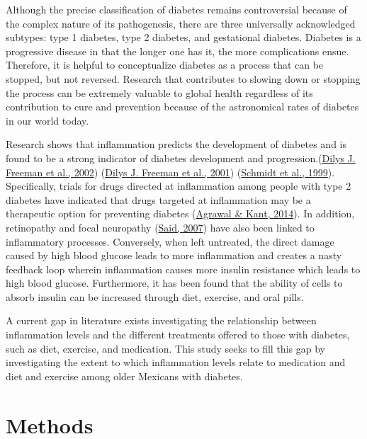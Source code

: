 \documentclass[
  man]{apa6}
\begin{document}
Although the precise classification of diabetes remains controversial because of the complex nature of its pathogenesis, there are three universally acknowledged subtypes: type 1 diabetes, type 2 diabetes, and gestational diabetes. Diabetes is a progressive disease in that the longer one has it, the more complications ensue. Therefore, it is helpful to conceptualize diabetes as a process that can be stopped, but not reversed. Research that contributes to slowing down or stopping the process can be extremely valuable to global health regardless of its contribution to cure and prevention because of the astronomical rates of diabetes in our world today.

Research shows that inflammation predicts the development of diabetes and is found to be a strong indicator of diabetes development and progression.(\protect\hyperlink{ref-freemanCreactiveProteinIndependent2002}{Dilys J. Freeman et al., 2002}) (\protect\hyperlink{ref-10.1161ux2f01.cir.103.3.357}{Dilys J. Freeman et al., 2001}) (\protect\hyperlink{ref-schmidtMarkersInflammationPrediction1999}{Schmidt et al., 1999}). Specifically, trials for drugs directed at inflammation among people with type 2 diabetes have indicated that drugs targeted at inflammation may be a therapeutic option for preventing diabetes (\protect\hyperlink{ref-10.4239ux2fwjd.v5.i5.697}{Agrawal \& Kant, 2014}). In addition, retinopathy and focal neuropathy (\protect\hyperlink{ref-saidDiabeticNeuropathyReview2007}{Said, 2007}) have also been linked to inflammatory processes. Conversely, when left untreated, the direct damage caused by high blood glucose leads to more inflammation and creates a nasty feedback loop wherein inflammation causes more insulin resistance which leads to high blood glucose. Furthermore, it has been found that the ability of cells to absorb insulin can be increased through diet, exercise, and oral pills.

A current gap in literature exists investigating the relationship between inflammation levels and the different treatments offered to those with diabetes, such as diet, exercise, and medication. This study seeks to fill this gap by investigating the extent to which inflammation levels relate to medication and diet and exercise among older Mexicans with diabetes.

\hypertarget{methods}{%
\section{Methods}\label{methods}}
\end{document}
